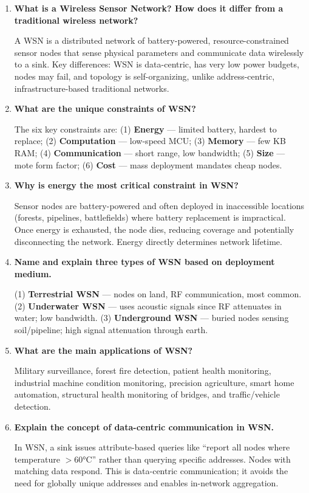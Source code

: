 \documentclass[12pt,a4paper]{article}
\newcommand{\Q}[1]{\textbf{#1}\par\noindent\ignorespaces}
\begin{document}
\begin{tcolorbox}[exambox, title={\textbf{Frequently Asked / Viva Questions}}]
\begin{enumerate}[topsep=0pt, label=\textbf{Q\arabic*.}, itemsep=5pt]
  \item \Q{What is a Wireless Sensor Network? How does it differ from a traditional wireless network?}
  A WSN is a distributed network of battery-powered, resource-constrained sensor nodes that sense physical parameters and communicate data wirelessly to a sink. Key differences: WSN is data-centric, has very low power budgets, nodes may fail, and topology is self-organizing, unlike address-centric, infrastructure-based traditional networks.

  \item \Q{What are the unique constraints of WSN?}
  The six key constraints are: (1) \textbf{Energy} --- limited battery, hardest to replace; (2) \textbf{Computation} --- low-speed MCU; (3) \textbf{Memory} --- few KB RAM; (4) \textbf{Communication} --- short range, low bandwidth; (5) \textbf{Size} --- mote form factor; (6) \textbf{Cost} --- mass deployment mandates cheap nodes.

  \item \Q{Why is energy the most critical constraint in WSN?}
  Sensor nodes are battery-powered and often deployed in inaccessible locations (forests, pipelines, battlefields) where battery replacement is impractical. Once energy is exhausted, the node dies, reducing coverage and potentially disconnecting the network. Energy directly determines network lifetime.

  \item \Q{Name and explain three types of WSN based on deployment medium.}
  (1) \textbf{Terrestrial WSN} --- nodes on land, RF communication, most common. (2) \textbf{Underwater WSN} --- uses acoustic signals since RF attenuates in water; low bandwidth. (3) \textbf{Underground WSN} --- buried nodes sensing soil/pipeline; high signal attenuation through earth.

  \item \Q{What are the main applications of WSN?}
  Military surveillance, forest fire detection, patient health monitoring, industrial machine condition monitoring, precision agriculture, smart home automation, structural health monitoring of bridges, and traffic/vehicle detection.

  \item \Q{Explain the concept of data-centric communication in WSN.}
  In WSN, a sink issues attribute-based queries like ``report all nodes where temperature $> 60$°C'' rather than querying specific addresses. Nodes with matching data respond. This is data-centric communication; it avoids the need for globally unique addresses and enables in-network aggregation.


\end{enumerate}
\end{tcolorbox}
\end{document}
